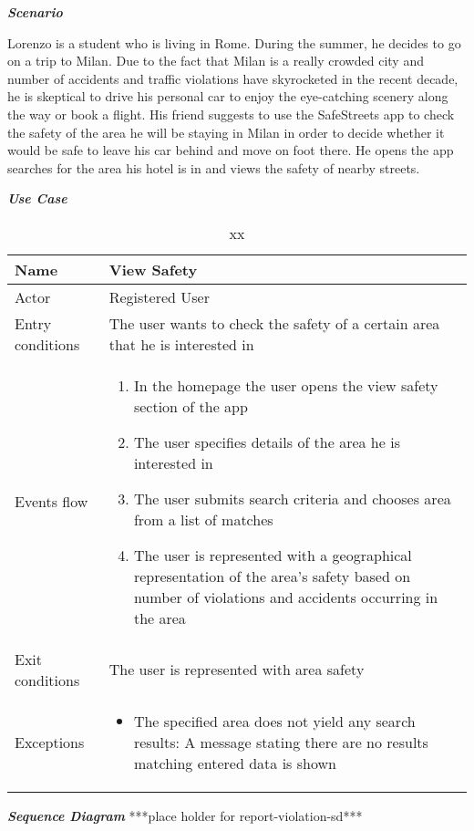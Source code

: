 \emph{\textbf{Scenario}}

Lorenzo is a student who is living in Rome. During the summer, he decides to go on a trip to Milan. Due to the fact that Milan is a really crowded city and number of accidents and traffic violations have skyrocketed in the recent decade, he is skeptical to drive his personal car to enjoy the eye-catching scenery along the way or book a flight. His friend suggests to use the SafeStreets app to check the safety of the area he will be staying in Milan in order to decide whether it would be safe to leave his car behind and move on foot there. He opens the app searches for the area his hotel is in and views the safety of nearby streets.

\emph{\textbf{Use Case}}

\begin{table}[!hbtp]
\footnotesize
\centering
\settowidth{}
\setlength\extrarowheight{2pt}
\begin{tabulary}{\textwidth}{|J|J|}
\hline
Name  & View Safety \\
\hline
Actor & Registered User \\
\hline
Entry conditions & The user wants to check the safety of a certain area that he is interested in \\
\hline
Events flow & 
\begin{minipage}[t]{0.7\textwidth}
\begin{enumerate} 
\item In the homepage the user opens the view safety section of the app
\item The user specifies details of the area he is interested in
\item The user submits search criteria and chooses area from a list of matches
\item The user is represented with a geographical representation of the area’s safety based on number of violations and accidents occurring in the area
\end{enumerate}
\end{minipage}\\
\hline
Exit conditions  & The user is represented with area safety\\
\hline
Exceptions       & 
\begin{minipage}[t]{0.8\textwidth}
\begin{itemize} 
\item The specified area does not yield any search results: A message stating there are no results matching entered data is shown
\end{itemize}
\end{minipage}\\
\hline
\end{tabulary}
\caption{\label{tab:xx}xx}
\end{table}

\emph{\textbf{Sequence Diagram}}
***place holder for report-violation-sd***
